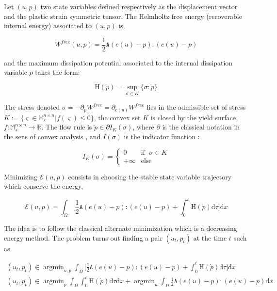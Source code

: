 \documentclass[10pt,oneside]{report}
\DeclareMathOperator*{\argmin}{argmin}
\begin{document}
Let $(u,p)$ two state variables defined respectively as the displacement vector and the plastic strain symmetric tensor. The Helmholtz free energy (recoverable internal energy) associated to $(u,p)$ is, 


$$ W^{free}(u,p)=\frac{1}{2}\mathtt{A} (e(u)-p):(e(u)-p) $$

and the maximum dissipation potential associated to the internal dissipation variable $p$ takes the form:

$$ \mathrm{H} (\dot{p})=\sup_{\sigma \in K} \{\sigma: \dot{p} \} $$

The stress denoted $\sigma= -\partial_p W^{free} = \partial_{e(u)} W^{free}$ lies in the admissible set of stress $K:=\{ \varsigma \in \mathbb{M}^{n\times n}_s | f(\varsigma) \leq 0 \}$, the convex set $K$ is closed by the yield surface, $f:\mathbb{M}^{n\times n}_s \rightarrow \mathbb{R}$. The flow rule is $\dot{p} \in \partial I_K(\sigma)$, where $\partial$ is the classical notation in the sens of convex analysis , and $I(\sigma) $ is the indicator function :

$$
I_K(\sigma) = \left\{
    \begin{array}{ll}
        0 & \mbox{if } \; \sigma \in K \\
        +\infty & \mbox{else}
    \end{array}
\right.
$$


Minimizing $\mathcal{E}(u,p)$ consists in choosing the stable state variable trajectory which conserve the energy,

$$ \mathcal{E}(u,p)= \int_{\Omega} \Big[  \frac{1}{2} \mathtt{A} (e(u)-p) :  (e(u)-p) + \int_0^t \mathrm{H} (\dot{p}) \mathrm{d} \tau \Big] \mathrm{d} x $$


The idea is to follow the classical alternate minimization which is a decreasing energy method. The problem turns out finding a pair $(u_t,p_t)$ at the time $t$ such as 


\begin{equation*}
\begin{split}
(u_t,p_t) \in \argmin_{u,p}  \int_{\Omega} \Big[  \frac{1}{2} \mathtt{A} (e(u)-p) :  (e(u)-p) + \int_0^t \mathrm{H} (\dot{p}) \mathrm{d} \tau \Big] \mathrm{d} x\\
(u_t,p_t) \in \argmin_{p}  \int_{\Omega} \int_0^t \mathrm{H} (\dot{p}) \mathrm{d} \tau  \mathrm{d} x + \argmin_{u}  \int_{\Omega} \frac{1}{2} \mathtt{A} (e(u)-p) :  (e(u)-p) \mathrm{d} x
\end{split}
\end{equation*}
\end{document}
